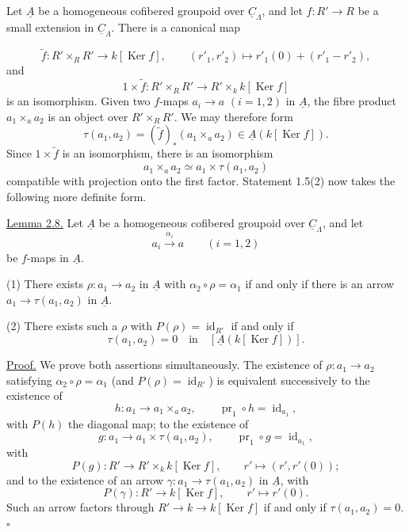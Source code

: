Let $\underline A$ be a homogeneous cofibered groupoid over
$\underline C_\Lambda$, and let $f:R'\longrightarrow R$ be a small
extension in $\underline C_\Lambda$. There is a canonical map


\[
 \widetilde f:R'\times_RR'\longrightarrow k[\operatorname{Ker}f],
 \qquad
 (r'_1,r'_2)\longmapsto r'_1(0)+(r'_1-r'_2),
\]
and
\[
 1\times\widetilde f:R'\times_RR'
 \longrightarrow R'\times_k k[\operatorname{Ker}f]
\]
is an isomorphism. Given two $f$-maps
$a_i\longrightarrow a$ $(i=1,2)$ in $\underline A$, the fibre
product $a_1\times_a a_2$ is an object over $R'\times_RR'$. We may
therefore form
\[
 \tau(a_1,a_2)=
 (\widetilde f)_*(a_1\times_a a_2)
 \in\underline A(k[\operatorname{Ker}f]).
\]
Since $1\times\widetilde f$ is an isomorphism, there is an
isomorphism
\[
 a_1\times_a a_2\simeq a_1\times\tau(a_1,a_2)
\]
compatible with projection onto the first factor. Statement 1.5(2)
now takes the following more definite form.

\underline{Lemma 2.8.} Let $\underline A$ be a homogeneous
cofibered groupoid over $\underline C_\Lambda$, and let
\[
 a_i\xrightarrow{\ \alpha_i\ }a\qquad(i=1,2)
\]
be $f$-maps in $\underline A$.

(1) There exists $\rho:a_1\longrightarrow a_2$ in $\underline A$
with $\alpha_2\circ\rho=\alpha_1$ if and only if there is an arrow
$a_1\longrightarrow\tau(a_1,a_2)$ in $\underline A$.

(2) There exists such a $\rho$ with $P(\rho)=\operatorname{id}_{R'}$
if and only if
\[
 \tau(a_1,a_2)=0
 \quad\text{in}\quad
 [\underline A(k[\operatorname{Ker}f])].
\]

\underline{Proof.} We prove both assertions simultaneously. The
existence of $\rho:a_1\longrightarrow a_2$ satisfying
$\alpha_2\circ\rho=\alpha_1$ (and $P(\rho)=\operatorname{id}_{R'}$)
is equivalent successively to the existence of
\[
 h:a_1\longrightarrow a_1\times_a a_2,
 \qquad \operatorname{pr}_1\circ h=\operatorname{id}_{a_1},
\]
with $P(h)$ the diagonal map; to the existence of
\[
 g:a_1\longrightarrow a_1\times\tau(a_1,a_2),
 \qquad \operatorname{pr}_1\circ g=\operatorname{id}_{a_1},
\]
with
\[
 P(g):R'\longrightarrow R'\times_k k[\operatorname{Ker}f],
 \qquad r'\longmapsto(r',r'(0));
\]
and to the existence of an arrow
$\gamma:a_1\longrightarrow\tau(a_1,a_2)$ in $\underline A$, with
\[
 P(\gamma):R'\longrightarrow k[\operatorname{Ker}f],
 \qquad r'\longmapsto r'(0).
\]
Such an arrow factors through
$R'\longrightarrow k\longrightarrow k[\operatorname{Ker}f]$ if and
only if $\tau(a_1,a_2)=0$. \hfill$\square$

